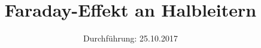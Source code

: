 

\subject{46}
\title{Faraday-Effekt an Halbleitern }
\date{
  Durchführung: 25.10.2017
}



\maketitle
\thispagestyle{empty}
\tableofcontents
\newpage
\setcounter{page}{1}





\printbibliography


